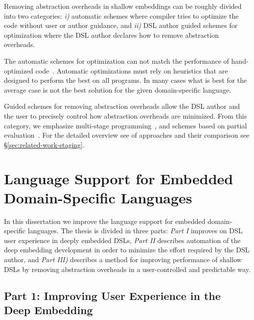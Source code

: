 Removing abstraction overheads in shallow embeddings can be roughly
 divided into two categories: \emph{i)} automatic schemes where compiler tries
 to optimize the code without user or author guidance, and \emph{ii)} DSL author
 guided schemes for optimization where the DSL author declares how to remove
 abstraction overheads.

The automatic schemes for optimization can not match the performance of hand-optimized
 code~\cite{rompf_optimizing_2013}. Automatic optimizations must rely on heuristics that
 are designed to perform the best on all programs. In many cases what is best for the
 average case is not the best solution for the given domain-specific language.

Guided schemes for removing abstraction overheads allow the DSL author and the user
to precisely control how abstraction overheads are minimized. From this category, we emphasize
multi-stage programming~\cite{taha_multi-stage_1997,taha2004gentle}, and schemes
based on partial evaluation~\cite{jones1993partial,brady2010scrapping}. For the detailed
overview see of approaches and their comparison see \S \ref{sec:related-work-staging}.

\section{Language Support for Embedded Domain-Specific Languages}
\label{sec:improving-language-support}

In this dissertation we improve the language support for embedded domain-specific languages. The
 thesis is divided in three parts: \emph{Part I} improves on DSL user experience in deeply embedded DSLs,
 \emph{Part II} describes automation of the deep embedding development in order to minimize
 the effort required by the DSL author, and \emph{Part III)} describes a method for improving
 performance of shallow DSLs by removing abstraction overheads in a user-controlled
 and predictable way.

\subsection{Part 1: Improving User Experience in the Deep Embedding}
\label{sec:user-experience}

